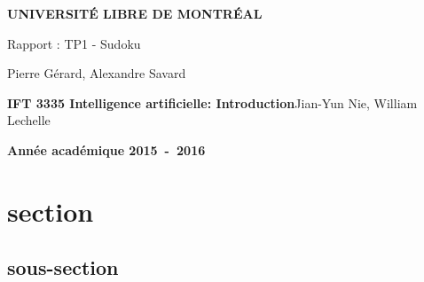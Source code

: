 \documentclass[a4paper,10pt]{article}
\begin{document}
\begin{titlepage}
\begin{center}
\textbf{\textsc{UNIVERSIT\'E LIBRE DE MONTR\'EAL}}\\
\vfill{}\vfill{}
\begin{center}{\Huge Rapport : TP1 - Sudoku}\end{center}{\Huge \par}
\begin{center}{\large Pierre Gérard, Alexandre Savard}\end{center}{\Huge \par}
\vfill{}\vfill{} \vfill{}
\begin{flushleft}{\large \textbf{IFT 3335 Intelligence artificielle: Introduction}}\hfill{Jian-Yun Nie, William Lechelle}\end{flushleft}{\large\par}
\vfill{}\vfill{}\enlargethispage{3cm}
\textbf{Année académique 2015~-~2016}
\end{center}
\end{titlepage}



\tableofcontents

\pagebreak


\section{section}
\subsection{sous-section}
\end{document}
